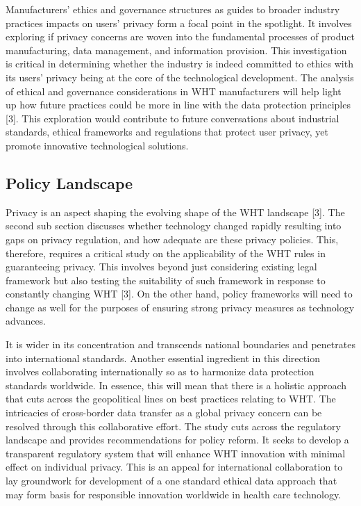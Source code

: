 \documentclass[11pt]{article}
\begin{document}
Manufacturers’ ethics and governance structures as guides to broader industry practices impacts on users’ privacy form a focal point in the spotlight. It involves exploring if privacy concerns are woven into the fundamental processes of product manufacturing, data management, and information provision. This investigation is critical in determining whether the industry is indeed committed to ethics with its users’ privacy being at the core of the technological development. The analysis of ethical and governance considerations in WHT manufacturers will help light up how future practices could be more in line with the data protection principles [3]. This exploration would contribute to future conversations about industrial standards, ethical frameworks and regulations that protect user privacy, yet promote innovative technological solutions.

\subsection{Policy Landscape}

Privacy is an aspect shaping the evolving shape of the WHT landscape [3]. The second sub section discusses whether technology changed rapidly resulting into gaps on privacy regulation, and how adequate are these privacy policies. This, therefore, requires a critical study on the applicability of the WHT rules in guaranteeing privacy. This involves beyond just considering existing legal framework but also testing the suitability of such framework in response to constantly changing WHT [3]. On the other hand, policy frameworks will need to change as well for the purposes of ensuring strong privacy measures as technology advances.

It is wider in its concentration and transcends national boundaries and penetrates into international standards. Another essential ingredient in this direction involves collaborating internationally so as to harmonize data protection standards worldwide. In essence, this will mean that there is a holistic approach that cuts across the geopolitical lines on best practices relating to WHT. The intricacies of cross-border data transfer as a global privacy concern can be resolved through this collaborative effort. The study cuts across the regulatory landscape and provides recommendations for policy reform. It seeks to develop a transparent regulatory system that will enhance WHT innovation with minimal effect on individual privacy. This is an appeal for international collaboration to lay groundwork for development of a one standard ethical data approach that may form basis for responsible innovation worldwide in health care technology.
\end{document}

